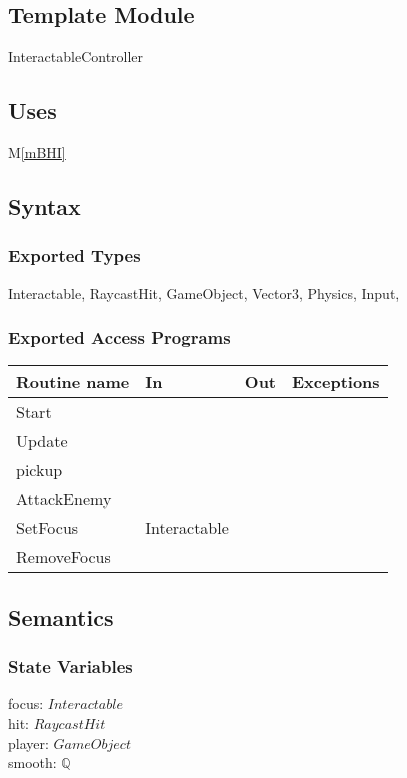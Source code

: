 \documentclass[12pt]{article}
\newcommand{\mref}[1]{M\ref{#1}}
\begin{document}
\subsection*{Template Module}

InteractableController

\subsection* {Uses}

\mref{mBHI}

\subsection* {Syntax}

\subsubsection* {Exported Types}

Interactable, RaycastHit, GameObject, Vector3, Physics, Input,

\subsubsection* {Exported Access Programs}

\begin{tabular}{| l | l | l | l |}
\hline
\textbf{Routine name} & \textbf{In} & \textbf{Out} & \textbf{Exceptions}\\
\hline
Start & ~ & ~  & ~\\
Update & ~ & ~ & ~\\
pickup & ~ & ~ & ~\\
AttackEnemy & ~ & ~ & ~\\
SetFocus & Interactable & ~ & ~\\
RemoveFocus & ~ & ~ & ~\\
\hline
\end{tabular}

\subsection* {Semantics}

\subsubsection* {State Variables}

focus: $Interactable$\\
hit: $RaycastHit$\\
player: $GameObject$\\
smooth: $\mathbb{Q}$
\end{document}
